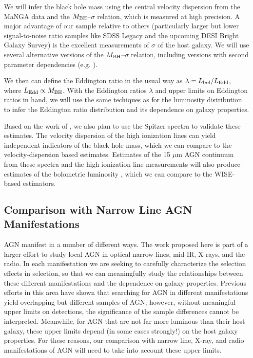 \documentclass[12pt, preprint]{hacked-aastex}
\begin{document}
We will infer the black hole mass using the central velocity
dispersion from the MaNGA data and the $M_{\rm BH}$--$\sigma$
relation, which is measured at high precision.  A major advantage of
our sample relative to others (particularly larger but lower
signal-to-noise ratio samples like SDSS Legacy and the upcoming DESI
Bright Galaxy Survey) is the excellent measurements of $\sigma$ of the
host galaxy. We will use several alternative versions of the $M_{\rm
  BH}$--$\sigma$ relation, including versions with second parameter
dependencies (e.g. \cite{kormendy13a, vandenbosch16a}).

We then can define the Eddington ratio in the usual way as $\lambda =
L_{\rm bol} / L_{\rm Edd}$, where $L_{\rm Edd}\propto M_{\rm BH}$.
With the Eddington ratios $\lambda$ and upper limits on Eddington
ratios in hand, we will use the same techiques as for the luminosity
distribution to infer the Eddington ratio distribution and its
dependence on galaxy properties.

Based on the work of \cite{dasyra08a}, we also plan to use the Spitzer
spectra to validate these estimates.  The velocity dispersion of the
high ionization lines can yield independent indicators of the black
hole mass, which we can compare to the velocity-dispersion based
estimates. Estimates of the 15 $\mu$m AGN continuum from these spectra
and the high ionization line measurements will also produce estimates
of the bolometric luminosity \cite{dasyra08a, shen20a}, which we can
compare to the WISE-based estimators. 

\subsection{Comparison with Narrow Line AGN Manifestations}
\label{sec:other}

AGN manifest in a number of different ways. The work proposed here is
part of a larger effort to study local AGN in optical narrow lines,
mid-IR, X-rays, and the radio. In each manifestation we are seeking to
carefully characterize the selection effects in selection, so that we
can meaningfully study the relationships between these different
manifestations and the dependence on galaxy properties. Previous
efforts in this area have shown that searching for AGN in different
manifestations yield overlapping but different samples of AGN;
however, without meaningful upper limits on detections, the
significance of the sample differences cannot be
interpreted. Meanwhile, for AGN that are not far more luminous than
their host galaxy, these upper limits depend (in some cases strongly!)
on the host galaxy properties.  For these reasons, our comparison with
narrow line, X-ray, and radio manifestations of AGN will need to take
into account these upper limits.
\end{document}
